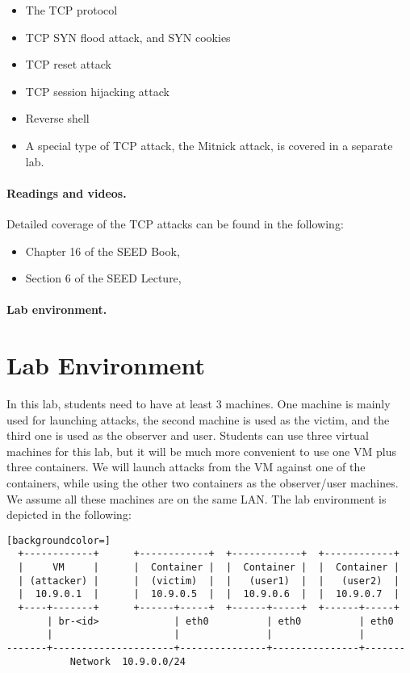 \begin{itemize}[noitemsep]
\item The TCP protocol
\item TCP SYN flood attack, and SYN cookies 
\item TCP reset attack
\item TCP session hijacking attack
\item Reverse shell 
\item A special type of TCP attack, the Mitnick attack, is covered 
in a separate lab. 
\end{itemize}


\paragraph{Readings and videos.}
Detailed coverage of the TCP attacks can be found in the following:

\begin{itemize}
\item Chapter 16 of the SEED Book, \seedbook
\item Section 6 of the SEED Lecture, \seedisvideo
\end{itemize}


\paragraph{Lab environment.} \seedenvironmentB



\section{Lab Environment}


In this lab, students need to have at least 3 machines. One machine 
is mainly used for launching attacks, the second machine is used as the victim, and 
the third one is used as the observer and user. Students can use three virtual 
machines for this lab, but it will be much more convenient to 
use one VM plus three containers. We will launch 
attacks from the VM against one of the containers, while using
the other two containers as the observer/user machines.
We assume all these machines are on the same LAN. 
The lab environment is depicted in the following:


\begin{lstlisting}[backgroundcolor=]
  +------------+      +------------+  +------------+  +------------+
  |     VM     |      |  Container |  |  Container |  |  Container |
  | (attacker) |      |  (victim)  |  |   (user1)  |  |   (user2)  |
  |  10.9.0.1  |      |  10.9.0.5  |  |  10.9.0.6  |  |  10.9.0.7  |
  +----+-------+      +------+-----+  +------+-----+  +------+-----+
       | br-<id>             | eth0          | eth0          | eth0
       |                     |               |               |
-------+---------------------+---------------+---------------+-------
           Network  10.9.0.0/24

\end{lstlisting}
 

